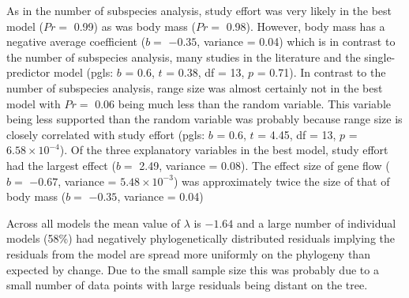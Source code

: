 As in the number of subspecies analysis, study effort was very likely in the best model ($Pr = $ 0.99) as was body mass ($Pr = $ 0.98).
However, body mass has a negative average coefficient ($b = $ \ensuremath{-0.35}, variance = 0.04) which is in contrast to the number of subspecies analysis, many studies in the literature \cite{kamiya2014determines, turmelle2009correlates, gay2014parasite, maganga2014bat} and the single-predictor model (pgls: $b$ = 0.6, $t$ = 0.38, df = 13, $p$ = 0.71).
In contrast to the number of subspecies analysis, range size was almost certainly not in the best model with $Pr = $ 0.06 being much less than the random variable.
This variable being less supported than the random variable was probably because range size is closely correlated with study effort (pgls: $b$ = 0.6, $t$ = 4.45, df = 13, $p$ = \ensuremath{6.58\times 10^{-4}}).
Of the three explanatory variables in the best model, study effort had the largest effect ($b = $ 2.49, variance = 0.08).
The effect size of gene flow ($b = $ \ensuremath{-0.67}, variance = \ensuremath{5.48\times 10^{-3}}) was approximately twice the size of that of body mass ($b = $ \ensuremath{-0.35}, variance = 0.04)

Across all models the mean value of $\lambda$ is \ensuremath{-1.64} and a large number of individual models (58\%)  had negatively phylogenetically distributed residuals implying the residuals from the model are spread more uniformly on the phylogeny than expected by change.
Due to the small sample size this was probably due to a small number of data points with large residuals being distant on the tree.








